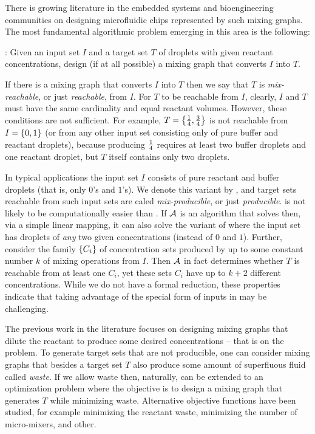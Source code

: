 There is growing literature in the embedded systems and bioengineering communities
on designing microfluidic chips  represented by such mixing graphs.
The most fundamental algorithmic problem emerging in this
area is the following:

\begin{description}
	\item{{\MixReachability:}}
Given an input set $I$ and a target set $T$ of droplets with given reactant concentrations, 
design (if at all possible) a mixing graph that converts $I$ into $T$.
\end{description}

If there is a mixing graph that converts $I$ into $T$ then we say that 
$T$ is \emph{mix-reachable}, or just \emph{reachable}, from $I$.  
For $T$ to be reachable from $I$, clearly, $I$ and $T$ must have the
same cardinality and equal reactant volumes. However,  these conditions
are not sufficient. For example, $T = { \left\{ {\textstyle\frac{1}{4}},{\textstyle\frac{3}{4}} \right\} }$
is not reachable from $I = { \left\{ 0,1 \right\} }$ (or from any other input set consisting only
of pure buffer and reactant droplets), because producing ${\textstyle\frac{1}{4}}$ 
requires at least
two buffer droplets and one reactant droplet, but $T$ itself contains only two droplets.
 
In typical applications the input set $I$ consists of pure
reactant and buffer droplets (that is, only $0$'s and $1$'s). 
We denote this variant by {\MixProducibility}, and target sets reachable from such input
sets are caled \emph{mix-producible}, or just \emph{producible}.
{\MixProducibility} is not likely to be computationally easier than  {\MixReachability}. 
If ${\cal A}$ is an algorithm that solves {\MixProducibility} then, via a simple linear
mapping, it can also solve the variant of {\MixReachability} where the input set
has droplets of \emph{any} two given concentrations (instead of $0$ and $1$). 
Further, consider the family ${ \left\{ C_i \right\} }$ of concentration sets produced by up to 
some constant number $k$ of mixing operations from $I$. Then ${\cal A}$ in fact determines whether $T$ is reachable
from at least one $C_i$, yet these sets $C_i$ have up to $k+2$ different
concentrations. While we do not have a formal reduction, these properties indicate that
taking advantage of
the special form of inputs in {\MixProducibility} may be challenging.



The previous work in the literature focuses on designing mixing graphs that dilute the reactant
to produce some desired concentrations -- that is on the {\MixProducibility} problem.
To generate target sets that are not producible, one can consider mixing
graphs that besides a target set $T$ also produce some amount of superfluous fluid
called \emph{waste}. If we allow waste then, naturally, {\MixProducibility} can be extended 
to an optimization problem where the objective is to design a
mixing graph that generates $T$ while minimizing waste. Alternative
objective functions have been studied, for example minimizing the
reactant waste, minimizing the number of micro-mixers, and other.

